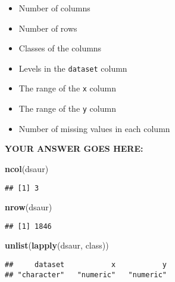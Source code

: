 \documentclass[
]{article}
\newenvironment{Shaded}{\begin{snugshade}}{\end{snugshade}}
\newcommand{\KeywordTok}[1]{\textcolor[rgb]{0.13,0.29,0.53}{\textbf{#1}}}
\newcommand{\NormalTok}[1]{#1}
\newcommand{\OperatorTok}[1]{\textcolor[rgb]{0.81,0.36,0.00}{\textbf{#1}}}
\providecommand{\tightlist}{%
  \setlength{\itemsep}{0pt}\setlength{\parskip}{0pt}}
\begin{document}
\begin{itemize}
\tightlist
\item
  Number of columns
\item
  Number of rows
\item
  Classes of the columns
\item
  Levels in the \texttt{dataset} column
\item
  The range of the \texttt{x} column
\item
  The range of the \texttt{y} column
\item
  Number of missing values in each column
\end{itemize}

\textbf{YOUR ANSWER GOES HERE:}

\begin{Shaded}
\begin{Highlighting}[]
\KeywordTok{ncol}\NormalTok{(dsaur)}
\end{Highlighting}
\end{Shaded}

\begin{verbatim}
## [1] 3
\end{verbatim}

\begin{Shaded}
\begin{Highlighting}[]
\KeywordTok{nrow}\NormalTok{(dsaur)}
\end{Highlighting}
\end{Shaded}

\begin{verbatim}
## [1] 1846
\end{verbatim}

\begin{Shaded}
\begin{Highlighting}[]
\KeywordTok{unlist}\NormalTok{(}\KeywordTok{lapply}\NormalTok{(dsaur, class))}
\end{Highlighting}
\end{Shaded}

\begin{verbatim}
##     dataset           x           y 
## "character"   "numeric"   "numeric"
\end{verbatim}

\begin{Shaded}
\end{Shaded}
\end{document}
